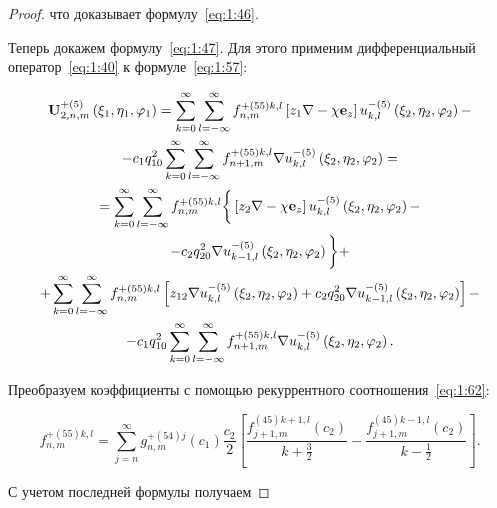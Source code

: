 \begin{russian}
\begin{proof}
\noindent что доказывает формулу~\eqref{eq:1:46}.

Теперь докажем формулу~\eqref{eq:1:47}. Для этого применим дифференциальный оператор~\eqref{eq:1:40} к формуле~\eqref{eq:1:57}:

\begin{multline}\label{eq:1:65}
{\bf{U}}_{2,n,m}^{ + (5)}\left( {{\xi _1},{\eta _1},{\varphi _1}} \right) = \sum\limits_{k = 0}^\infty  {\sum\limits_{l =  - \infty }^\infty  {f_{n,m}^{ + (55)k,l}} } \left[ {{z_1}\nabla  - \chi {{\bf{e}}_z}} \right]u_{k,l}^{ - (5)}\left( {{\xi _2},{\eta _2},{\varphi _2}} \right) - \\
- {c_1}q_{10}^2\sum\limits_{k = 0}^\infty  {\sum\limits_{l =  - \infty }^\infty  {f_{n + 1,m}^{ + (55)k,l}} } \nabla u_{k,l}^{ - (5)}\left( {{\xi _2},{\eta _2},{\varphi _2}} \right) = \\
= \sum\limits_{k = 0}^\infty  {\sum\limits_{l =  - \infty }^\infty  {f_{n,m}^{ + (55)k,l}} } \bigg\{ \left[ {{z_2}\nabla  - \chi {{\bf{e}}_z}} \right]u_{k,l}^{ - (5)}\left( {{\xi _2},{\eta _2},{\varphi _2}} \right) - \\
- {c_2}q_{20}^2\nabla u_{k - 1,l}^{ - (5)}\left( {{\xi _2},{\eta _2},{\varphi _2}} \right) \bigg\} + \\
+ \sum\limits_{k = 0}^\infty  {\sum\limits_{l =  - \infty }^\infty  {f_{n,m}^{ + (55)k,l}} } \left[ {{z_{12}}\nabla u_{k,l}^{ - (5)}\left( {{\xi _2},{\eta _2},{\varphi _2}} \right) + {c_2}q_{20}^2\nabla u_{k - 1,l}^{ - (5)}\left( {{\xi _2},{\eta _2},{\varphi _2}} \right)} \right] - \\
- {c_1}q_{10}^2\sum\limits_{k = 0}^\infty  {\sum\limits_{l =  - \infty }^\infty  {f_{n + 1,m}^{ + (55)k,l}} } \nabla u_{k,l}^{ - (5)}\left( {{\xi _2},{\eta _2},{\varphi _2}} \right).
\end{multline}

Преобразуем коэффициенты с помощью рекуррентного соотношения~\eqref{eq:1:62}:{\sloppy\par}

\begin{equation}\label{eq:1:66}
f_{n,m}^{ + (55)k,l} = \sum\limits_{j = n}^\infty  {g_{n,m}^{ + (54)j}} ({c_1})\frac{{{c_2}}}{2}\left[ {\frac{{f_{j + 1,m}^{(45)k + 1,l}({c_2})}}{{k + \frac{3}{2}}} - \frac{{f_{j + 1,m}^{(45)k - 1,l}({c_2})}}{{k - \frac{1}{2}}}} \right].
\end{equation}

С учетом последней формулы получаем


\end{proof}
\end{russian}
